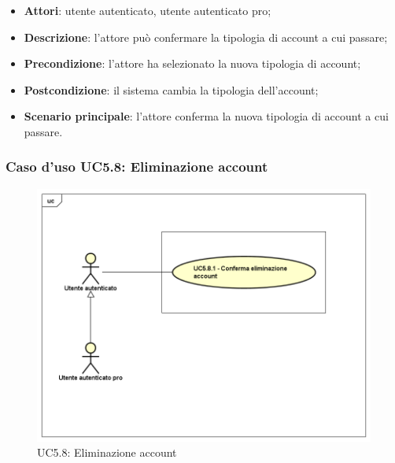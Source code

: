 \begin{itemize}
	\item \textbf{Attori}: utente autenticato, utente autenticato pro;
	\item \textbf{Descrizione}: l'attore può confermare la tipologia di account a cui passare;
	\item \textbf{Precondizione}: l'attore ha selezionato la nuova tipologia di account;
	\item \textbf{Postcondizione}: il sistema cambia la tipologia dell'account;
	\item \textbf{Scenario principale}: l'attore conferma la nuova tipologia di account a cui passare.
\end{itemize}

\subsubsection{Caso d'uso UC5.8: Eliminazione account}
\label{UC5.8}
\begin{figure}[h]
	\centering
	\includegraphics[scale=0.5,keepaspectratio]{UML/UC5_8.png}
	\caption{UC5.8: Eliminazione account}
\end{figure}

